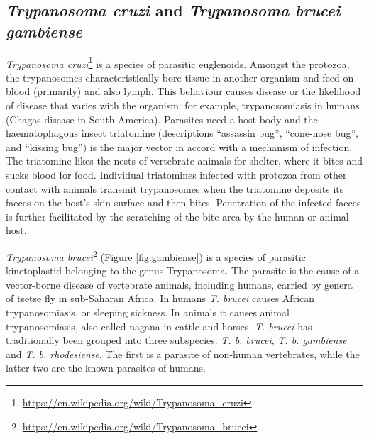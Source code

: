 \documentclass[]{book}
\let\rmarkdownfootnote\footnote%
\def\footnote{\protect\rmarkdownfootnote}
\renewcommand{\href}[2]{#2\footnote{\url{#1}}}
\begin{document}
\hypertarget{trypanosoma-cruzi-and-trypanosoma-brucei-gambiense}{%
\subsection{\texorpdfstring{\emph{Trypanosoma cruzi} and \emph{Trypanosoma brucei gambiense}}{Trypanosoma cruzi and Trypanosoma brucei gambiense}}\label{trypanosoma-cruzi-and-trypanosoma-brucei-gambiense}}

\href{https://en.wikipedia.org/wiki/Trypanosoma_cruzi}{\emph{Trypanosoma cruzi}} is a species of parasitic euglenoids. Amongst the protozoa, the trypanosomes characteristically bore tissue in another organism and feed on blood (primarily) and also lymph. This behaviour causes disease or the likelihood of disease that varies with the organism: for example, trypanosomiasis in humans (Chagas disease in South America). Parasites need a host body and the haematophagous insect triatomine (descriptions ``assassin bug'', ``cone-nose bug'', and ``kissing bug'') is the major vector in accord with a mechanism of infection. The triatomine likes the nests of vertebrate animals for shelter, where it bites and sucks blood for food. Individual triatomines infected with protozoa from other contact with animals transmit trypanosomes when the triatomine deposits its faeces on the host's skin surface and then bites. Penetration of the infected faeces is further facilitated by the scratching of the bite area by the human or animal host.

\href{https://en.wikipedia.org/wiki/Trypanosoma_brucei}{\emph{Trypanosoma brucei}} (Figure \ref{fig:gambiense}) is a species of parasitic kinetoplastid belonging to the genus Trypanosoma. The parasite is the cause of a vector-borne disease of vertebrate animals, including humans, carried by genera of tsetse fly in sub-Saharan Africa. In humans \emph{T. brucei} causes African trypanosomiasis, or sleeping sickness. In animals it causes animal trypanosomiasis, also called nagana in cattle and horses. \emph{T. brucei} has traditionally been grouped into three subspecies: \emph{T. b. brucei}, \emph{T. b. gambiense} and \emph{T. b. rhodesiense}. The first is a parasite of non-human vertebrates, while the latter two are the known parasites of humans.
\end{document}
